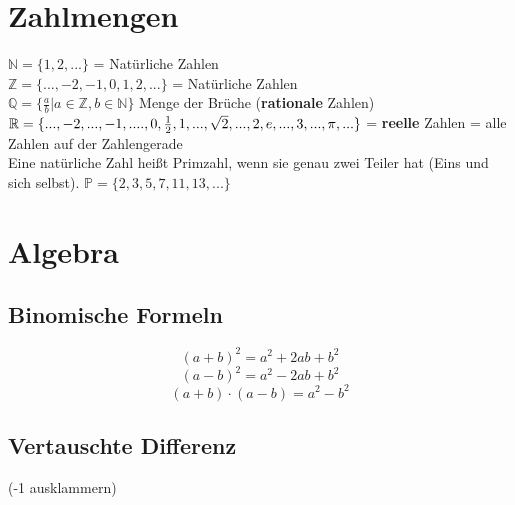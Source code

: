 



\usepackage{amssymb} %
\renewcommand{\metaHeaderLine}{Formelsammlung GESO}
\renewcommand{\arbeitsblattTitel}{Abschlussprüfung V. 0.0.0 2021-06-08 fp}

\arbeitsblattHeader{}
 \begin{multicols}{2}

\section{Zahlmengen}

$\mathbb{N} = \{1,2, ...\}  $ = Natürliche Zahlen\\
$\mathbb{Z} = \{..., -2, -1, 0, 1,2, ...\}  $ = Natürliche Zahlen\\
$\mathbb{Q} = \{\frac{a}b | a\in \mathbb{Z}, b\in\mathbb{N}\}$ Menge der Brüche (\textbf{rationale} Zahlen)\\
$\mathbb{R} = \{..., -2, ..., -1, ...., 0,
\frac12, 1,...,\sqrt{2},...,2, e,\\
..., 3, ..., \pi, ...\}  $ = \textbf{reelle} Zahlen = alle Zahlen auf der Zahlengerade\\

Eine natürliche Zahl heißt Primzahl, wenn sie genau zwei Teiler hat (Eins und sich selbst). $\mathbb{P} = \{2, 3, 5, 7, 11, 13, ...\}$

\hrulefill

\section{Algebra}
\subsection{Binomische Formeln}

$$(a+b)^2 = a^2+2ab + b^2$$
$$(a-b)^2=a^2-2ab+b^2$$
$$(a+b)\cdot(a-b) = a^2 - b^2$$

\hrulefill

\subsection{Vertauschte Differenz}
(-1 ausklammern)


\end{multicols}
